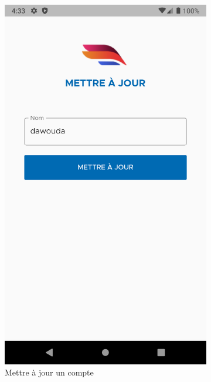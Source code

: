 \begin{itemize}[label=$\ast$]
\begin{figure}
\begin{subfigure}[b]{0.3\textwidth}
		\includegraphics[width=\textwidth]{./Template LaTeX/Images/From_emu/A_up_s.png}
		\caption{Mettre à jour un compte}
		\label{fig:five over x}
	\end{subfigure}
	\newline
	\centering
	\begin{subfigure}{0.3\textwidth}

\end{subfigure}
\end{figure}
\end{itemize}
